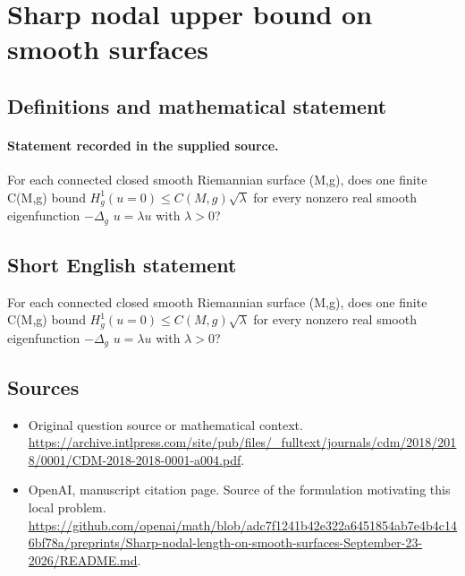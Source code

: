 \documentclass[11pt]{article}
\begin{document}
\section*{Sharp nodal upper bound on smooth surfaces}\label{statement}
\subsection{Definitions and mathematical statement}
\paragraph{Statement recorded in the supplied source.}
For each connected closed smooth Riemannian surface (M,g), does one finite C(M,g) bound $H^{1}_g({u=0})\leq C(M,g)\surd \lambda $ for every nonzero real smooth eigenfunction $-\Delta _g$ $u=\lambda u$ with $\lambda >0$?
\subsection{Short English statement}
For each connected closed smooth Riemannian surface (M,g), does one finite C(M,g) bound $H^{1}_g({u=0})\leq C(M,g)\surd \lambda $ for every nonzero real smooth eigenfunction $-\Delta _g$ $u=\lambda u$ with $\lambda >0$?
\subsection{Sources}
\begin{itemize}
\item[S1] Original question source or mathematical context.
\url{https://archive.intlpress.com/site/pub/files/_fulltext/journals/cdm/2018/2018/0001/CDM-2018-2018-0001-a004.pdf}.
\item[S2] OpenAI, manuscript citation page. Source of the formulation motivating this local problem.
\url{https://github.com/openai/math/blob/adc7f1241b42e322a6451854ab7e4b4c146bf78a/preprints/Sharp-nodal-length-on-smooth-surfaces-September-23-2026/README.md}.
\end{itemize}
\end{document}
